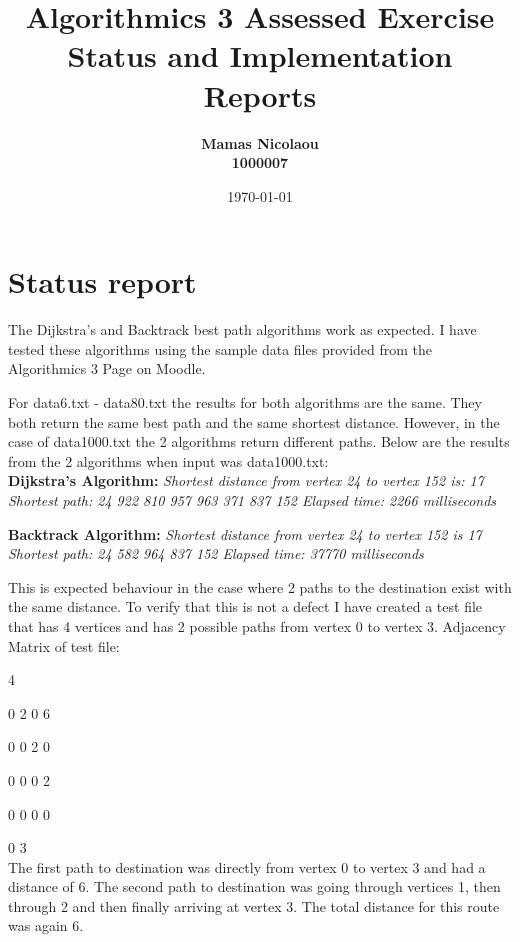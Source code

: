 \documentclass{article}
\title{Algorithmics 3 Assessed Exercise\\ \vspace{4mm} 
Status and Implementation Reports}
\author{\bf Mamas Nicolaou\\ \bf 1000007}
\date{\today}
\begin{document}
\maketitle
\section*{Status report}
The Dijkstra's and Backtrack best path algorithms work as expected. I have tested these algorithms using the sample data files provided from the Algorithmics 3 Page on Moodle.

For data6.txt - data80.txt the results for both algorithms are the same. They both return the same best path and the same shortest distance. However, in the case of data1000.txt the 2 algorithms return different paths. Below are the results from the 2 algorithms when input was data1000.txt:\\

\textbf{Dijkstra's Algorithm:\newline}
\textit{Shortest distance from vertex 24 to vertex 152 is: 17 \newline
Shortest path: 24 922 810 957 963 371 837 152 \newline
Elapsed time: 2266 milliseconds \newline}


\textbf{Backtrack Algorithm: \newline }
\textit{Shortest distance from vertex 24 to vertex 152 is 17 \newline
Shortest path: 24 582 964 837 152 \newline
Elapsed time: 37770 milliseconds \newline}

This is expected behaviour in the case where 2 paths to the destination exist with the same distance. To verify that this is not a defect I have created a test file that has 4 vertices and has 2 possible  paths from vertex 0 to vertex 3.\newline
Adjacency Matrix of test file:

4

0 2 0 6

0 0 2 0

0 0 0 2

0 0 0 0

0 3\\



The first path to destination was directly from vertex 0 to vertex 3 and had a distance of 6.
The second path to destination was going through vertices 1, then through 2 and then finally arriving at vertex 3. The total distance for this route was again 6.\\
\end{document}
